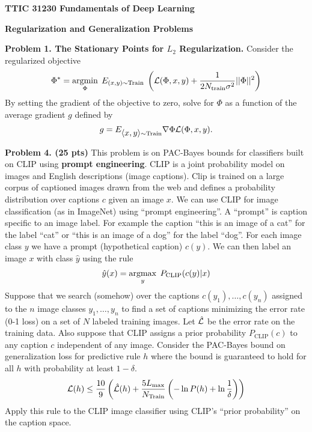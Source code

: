 \documentclass{article}
\newcommand{\solution}[1]{}
\begin{document}
\centerline{\bf TTIC 31230 Fundamentals of Deep Learning}
\bigskip
\centerline{\bf Regularization and  Generalization Problems}

\bigskip
\bigskip

{\bf Problem 1. The Stationary Points for $L_2$ Regularization.} Consider the regularized objective
$$\Phi^* = \operatorname*{argmin}_\Phi \;E_{(x,y) \sim \mathrm{Train}}\;\left({\cal L}(\Phi,x,y) + \frac{1}{2N_{\mathrm{train}}\sigma^2}||\Phi||^2\right)$$
By setting the gradient of the objective to zero, solve for $\Phi$ as a function of the average gradient $g$ defined by
$$g = E_{{\mbox{$\langle x,y\rangle$}}\sim \mathrm{Train}} \nabla \Phi {\cal L}(\Phi,x,y).$$

\solution{
  \begin{eqnarray*}
    & & \nabla_\Phi E_{(x,y) \sim \mathrm{Train}}\;{\cal L}(\Phi,x,y) + \frac{1}{2N_{\mathrm{train}}\sigma^2}||\Phi||^2 \\
    \\
    & = & \left(E_{(x,y) \sim \mathrm{Train}}\;\nabla_\Phi {\cal L}(\Phi,x,y)\right) + \frac{1}{N_{\mathrm{train}}\sigma^2}\Phi \\
    \\
    & = & g + \frac{1}{N_{\mathrm{train}}\sigma^2}\Phi \;\;= 0 \\
    \\
    \Phi & = & - N_{\mathrm{train}}\sigma^2g
  \end{eqnarray*}

  \medskip
  Note that a larger sample size justifies having a larger norm for the parameter vector.
}


\bigskip
{\bf Problem 4. (25 pts)} This problem is on PAC-Bayes bounds for classifiers built on CLIP using {\bf prompt engineering}.  CLIP is a joint probability model on images
and English descriptions (image captions).  Clip is trained on a large corpus of captioned images drawn from the web and defines a probability distribution over captions $c$ given an image $x$.
We can use CLIP for image classification (as in ImageNet) using ``prompt engineering''.  A ``prompt'' is caption specific to an image label.  For example the caption ``this is an image of a cat'' for the label ``cat'' or ``this is an image of a dog''
for the label ``dog''. For each image class $y$ we have a prompt (hypothetical caption) $c(y)$.
We can then label an image $x$ with class $\hat{y}$ using the rule
$$\hat{y}(x) = \operatorname*{argmax}_y \;P_{\mathrm{CLIP}}(c(y)|x)$$
Suppose that we search (somehow) over the captions $c(y_1),\ldots,c(y_n)$ assigned to the $n$
image classes $y_1,\ldots,y_n$ to find a set of captions minimizing the error rate (0-1 loss) on a set of $N$ labeled training images.  Let $\hat{\cal L}$ be the error rate on the training data.
Also suppose that CLIP assigns a prior probability $P_{\mathrm{CLIP}}(c)$ to any caption $c$ independent of any image.  Consider the PAC-Bayes bound on generalization loss for predictive rule $h$
where the bound is guaranteed to hold for all $h$ with probability at least $1-\delta$.
$${\cal L}(h) \leq \frac{10}{9}\left(\hat{{\cal L}}(h) + \frac{5L_{\max}}{N_\mathrm{Train}}\left(- \ln P(h) +\ln\frac{1}{\delta}\right)\right)$$
Apply this rule to the CLIP image classifier using CLIP's ``prior probability'' on the caption space.

\solution{
  $${\cal L}(h) \leq \frac{10}{9}\left(\hat{{\cal L}}(h) + \frac{5}{N}\left(\left(\sum_y - \ln P_{\mathrm{CLIP}}(c(y))\right) +\ln\frac{1}{\delta}\right)\right)$$

  I am not proposing that searching over all captions is a good idea.  Some narrower prior is called for.
}
\end{document}
